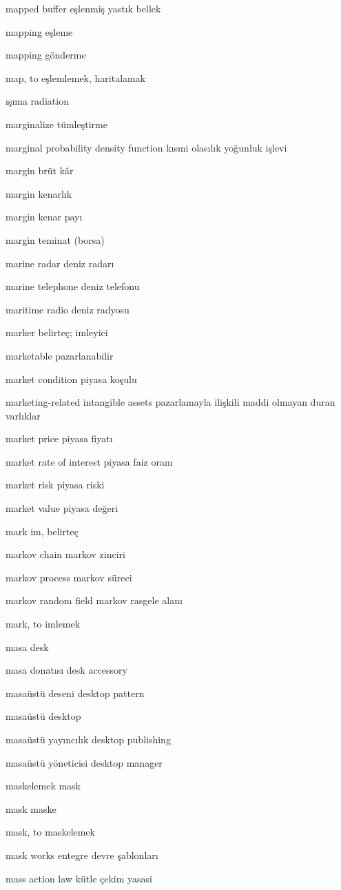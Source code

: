 \documentclass[12pt,fleqn]{article}\usepackage{../../common}
\begin{document}
mapped buffer eşlenmiş yastık bellek

mapping eşleme

mapping gönderme

map, to eşlemlemek, haritalamak

ışıma radiation

marginalize tümleştirme

marginal probability density function kısmi olasılık yoğunluk işlevi

margin brüt kâr

margin kenarlık

margin kenar payı

margin teminat (borsa)

marine radar deniz radarı

marine telephone deniz telefonu

maritime radio deniz radyosu

marker belirteç; imleyici

marketable pazarlanabilir

market condition piyasa koşulu

marketing-related intangible assets pazarlamayla ilişkili maddi olmayan duran varlıklar

market price piyasa fiyatı

market rate of interest piyasa faiz oranı

market risk piyasa riski

market value piyasa değeri

mark im, belirteç

markov chain markov zinciri

markov process markov süreci

markov random field markov rasgele alanı

mark, to imlemek

masa desk

masa donatısı desk accessory

masaüstü deseni desktop pattern

masaüstü desktop

masaüstü yayıncılık desktop publishing

masaüstü yöneticisi desktop manager

maskelemek mask

mask maske

mask, to maskelemek

mask works entegre devre şablonları

mass action law kütle çekim yasasi
\end{document}
